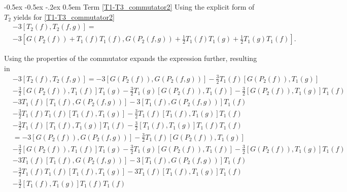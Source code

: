 \documentclass[oneside,reqno,12pt]{amsart}
\makeatletter
\renewcommand\subsection{\@startsection {subsection}{1}{\z@}%
                                   {-0.5ex \@plus -0.5ex \@minus -.2ex}%
                                   {0.5em}%
                                   {\normalfont\bfseries}}
\makeatother
\begin{document}
\subsection{Term \eqref{T1-T3_commutator2}}
Using the explicit form of \(T_2\) yields for \eqref{T1-T3_commutator2}
\begin{align}\tag*{}
&-3\left[T_2(f),T_2(f,g)\right]=\\
&-3\left[G(P_2(f))+ T_1(f)T_1(f) ,G(P_2(f,g))+ \frac{1}{2}T_1(f)T_1(g)+ \frac{1}{2}T_1(g)T_1(f)\right]
.\end{align}

Using the properties of the commutator expands the expression further, resulting in
\begin{align}\tag*{}
&-3\left[T_2(f),T_2(f,g)\right]=
-3\left[ G(P_2(f)),G(P_2(f,g))\right]
-\frac{3}{2}T_1(f)\left[ G(P_2(f)),T_1(g)\right]\\\tag*{}
&-\frac{3}{2}\left[ G(P_2(f)),T_1(f)\right]T_1(g)
-\frac{3}{2}T_1(g)\left[ G(P_2(f)),T_1(f)\right]
-\frac{3}{2}\left[ G(P_2(f)),T_1(g)\right]T_1(f)\\\tag*{}
&-3T_1(f)\left[T_1(f),G(P_2(f,g))\right]
-3\left[T_1(f),G(P_2(f,g))\right]T_1(f)\\\tag*{}
&-\frac{3}{2}T_1(f)T_1(f)\left[T_1(f),T_1(g)\right]
-\frac{3}{2}T_1(f)\left[T_1(f),T_1(g)\right]T_1(f)\\
&-\frac{3}{2}T_1(f)\left[T_1(f),T_1(g)\right]T_1(f)
-\frac{3}{2}\left[T_1(f),T_1(g)\right]T_1(f) T_1(f)\\\tag*{}
&=-3\left[ G(P_2(f)),G(P_2(f,g))\right]
-\frac{3}{2}T_1(f)\left[ G(P_2(f)),T_1(g)\right]\\\tag*{}
&-\frac{3}{2}\left[ G(P_2(f)),T_1(f)\right]T_1(g)
-\frac{3}{2}T_1(g)\left[ G(P_2(f)),T_1(f)\right]
-\frac{3}{2}\left[ G(P_2(f)),T_1(g)\right]T_1(f)\\\tag*{}
&-3T_1(f)\left[T_1(f),G(P_2(f,g))\right]
-3\left[T_1(f),G(P_2(f,g))\right]T_1(f)\\\tag*{}
&-\frac{3}{2}T_1(f)T_1(f)\left[T_1(f),T_1(g)\right]
-3T_1(f)\left[T_1(f),T_1(g)\right]T_1(f)\\
&-\frac{3}{2}\left[T_1(f),T_1(g)\right]T_1(f) T_1(f)
\end{align}
\end{document}
